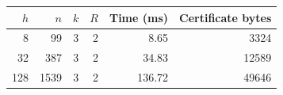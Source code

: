 \begin{tabular}{rrrrrr}
\toprule
$h$ & $n$ & $k$ & $R$ & Time (ms) & Certificate bytes \\
\midrule
8 & 99 & 3 & 2 & 8.65 & 3324 \\
32 & 387 & 3 & 2 & 34.83 & 12589 \\
128 & 1539 & 3 & 2 & 136.72 & 49646 \\
\bottomrule
\end{tabular}
